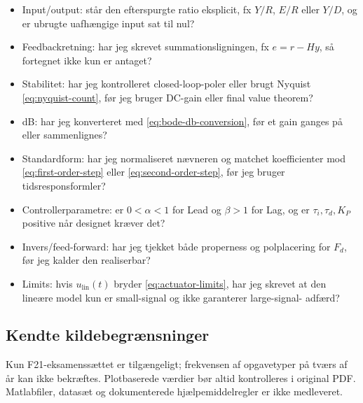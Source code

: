 \begin{itemize}
\item Input/output: står den efterspurgte ratio eksplicit, fx \(Y/R\), \(E/R\) eller
      \(Y/D\), og er ubrugte uafhængige input sat til nul?
\item Feedbackretning: har jeg skrevet summationsligningen, fx \(e=r-Hy\), så fortegnet
      ikke kun er antaget?
\item Stabilitet: har jeg kontrolleret closed-loop-poler eller brugt Nyquist
      \eqref{eq:nyquist-count}, før jeg bruger DC-gain eller final value theorem?
\item dB: har jeg konverteret med \eqref{eq:bode-db-conversion}, før et gain ganges på
      eller sammenlignes?
\item Standardform: har jeg normaliseret nævneren og matchet koefficienter mod
      \eqref{eq:first-order-step} eller \eqref{eq:second-order-step}, før jeg bruger
      tidsresponsformler?
\item Controllerparametre: er \(0<\alpha<1\) for Lead og \(\beta>1\) for Lag, og er
      \(\tau_i,\tau_d,K_P\) positive når designet kræver det?
\item Invers/feed-forward: har jeg tjekket både properness og polplacering for
      \(F_d\), før jeg kalder den realiserbar?
\item Limits: hvis \(u_{\mathrm{lin}}(t)\) bryder \eqref{eq:actuator-limits}, har jeg
      skrevet at den lineære model kun er small-signal og ikke garanterer large-signal-
      adfærd?
\end{itemize}

\subsection{Kendte kildebegrænsninger}

Kun F21-eksamenssættet er tilgængeligt; frekvensen af opgavetyper på tværs af år kan
ikke bekræftes. Plotbaserede værdier bør altid kontrolleres i original PDF. Matlabfiler,
datasæt og dokumenterede hjælpemiddelregler er ikke medleveret.
